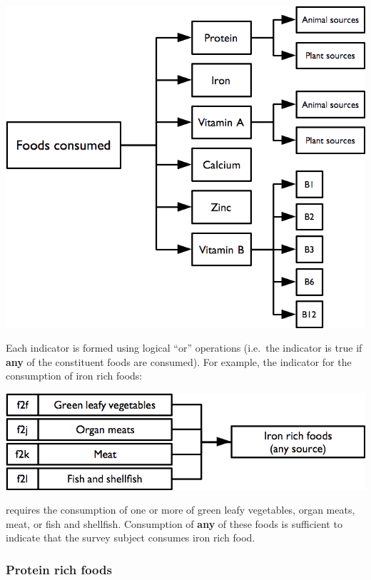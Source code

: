 \documentclass[12pt,a4paper]{book}
\theoremstyle{definition}
\theoremstyle{definition}
\theoremstyle{definition}
\theoremstyle{remark}
\begin{document}
\begin{center}\includegraphics[width=9.76in]{figures/indicators07} \end{center}

Each indicator is formed using logical ``or'' operations (i.e.~the
indicator is true if \textbf{any} of the constituent foods are
consumed). For example, the indicator for the consumption of iron rich
foods:

\begin{center}\includegraphics[width=9.76in]{figures/indicators08} \end{center}

requires the consumption of one or more of green leafy vegetables, organ
meats, meat, or fish and shellfish. Consumption of \textbf{any} of these
foods is sufficient to indicate that the survey subject consumes iron
rich food.

\hypertarget{protein-rich-foods}{%
\subsubsection{Protein rich foods}\label{protein-rich-foods}}
\end{document}
